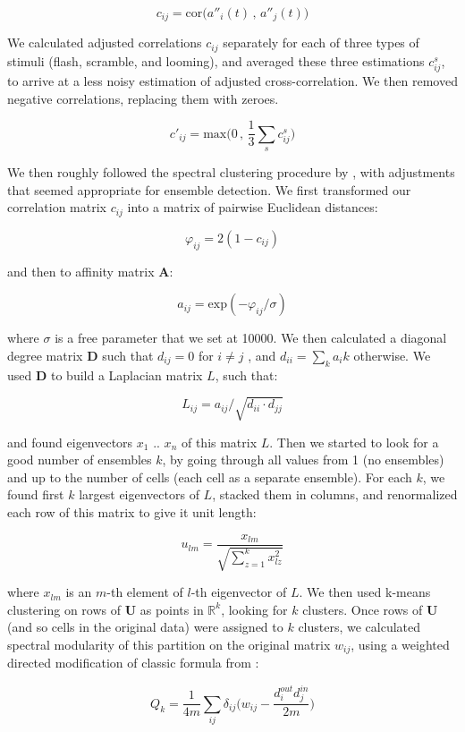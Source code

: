 \documentclass{article}
\begin{document}
\[ c_{ij} = \text{cor}\big(a''_i(t)\, , \, a''_j(t)\big) \]

We calculated adjusted correlations $c_{ij}$ separately for each of three types of stimuli (flash, scramble, and looming), and averaged these three estimations $c_{ij}^s$, to arrive at a less noisy estimation of adjusted cross-correlation. We then removed negative correlations, replacing them with zeroes.

\[ c'_{ij} = \text{max}\big(0 \, , \, \frac{1}{3} \sum_{s}{c_{ij}^s}\big) \]

We then roughly followed the spectral clustering procedure by \citep{ng2002spectral}, with adjustments that seemed appropriate for ensemble detection. We first transformed our correlation matrix $c_{ij}$ into a matrix of pairwise Euclidean distances:

\[ \varphi_{ij} = 2(1-c_{ij}) \]

and then to affinity matrix $\mathbf{A}$:

\[ a_{ij} = \text{exp}(-\varphi_{ij}/\sigma) \]

where $\sigma$ is a free parameter that we set at 10000. We then calculated a diagonal degree matrix $\mathbf{D}$ such that $d_{ij} = 0$ for $i \neq j$ , and $d_{ii} = \sum_k{a_ik}$ otherwise. We used $\mathbf{D}$ to build a Laplacian matrix $L$, such that:

\[ L_{ij} = a_{ij}/\sqrt{d_{ii}\cdot d_{jj}} \]

and found eigenvectors $x_1$ .. $x_n$ of this matrix $L$. Then we started to look for a good number of ensembles $k$, by going through all values from 1 (no ensembles) and up to the number of cells (each cell as a separate ensemble). For each $k$, we found first $k$ largest eigenvectors of $L$, stacked them in columns, and renormalized each row of this matrix to give it unit length:

\[ u_{lm} = \frac{x_{lm}}{\sqrt{\sum_{z=1}^{k}{x_{lz}^2}}} \]

where $x_{lm}$ is an $m$-th element of $l$-th eigenvector of $L$. We then used k-means clustering on rows of $\textbf{U}$ as points in $\mathbb{R}^k$, looking for $k$ clusters. Once rows of $\textbf{U}$ (and so cells in the original data) were assigned to $k$ clusters, we calculated spectral modularity of this partition on the original matrix $w_{ij}$, using a weighted directed modification of classic formula from \citep{newman2006modularity}:

\[ Q_k = \frac{1}{4m}\sum_{ij}{\delta_{ij}\Big(w_{ij}-\frac{d^{out}_i d^{in}_j}{2m}}\Big) \]
\end{document}

